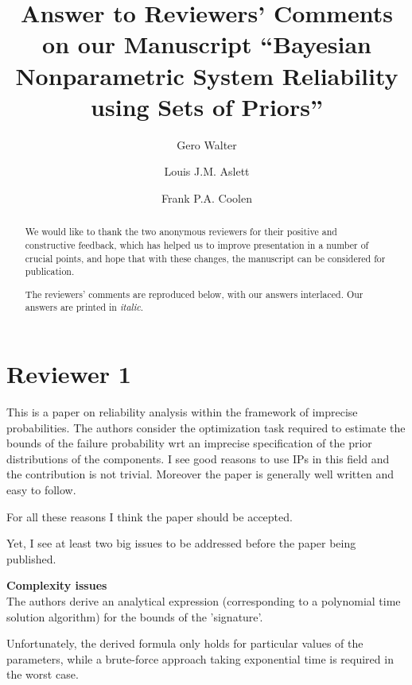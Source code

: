 \documentclass[12pt, a4paper]{elsarticle}
\begin{document}
\begin{frontmatter}
\title{Answer to Reviewers' Comments on our Manuscript ``Bayesian Nonparametric System Reliability\\ using Sets of Priors''}

\author[ein]{Gero Walter}
\author[oxf]{Louis J.M. Aslett}
\author[dur]{Frank P.A. Coolen}

\address[ein]{School of Industrial Engineering, Eindhoven University of Technology, Eindhoven, NL}
\address[oxf]{Department of Statistics, University of Oxford, Oxford, UK}
\address[dur]{Department of Mathematical Sciences, Durham University, Durham, UK}

\begin{abstract}
We would like to thank the two anonymous reviewers for their positive and constructive feedback,
which has helped us to improve presentation in a number of crucial points, and hope that with these changes,
the manuscript can be considered for publication.

The reviewers' comments are reproduced below, with our answers interlaced. Our answers are printed in \emph{italic}.
\end{abstract}
\end{frontmatter}

\section*{Reviewer 1}

This is a paper on reliability analysis within the framework of imprecise probabilities. The authors consider the optimization task required to estimate the bounds of the failure probability wrt an imprecise specification of the prior distributions of the components. I see good reasons to use IPs in this field and the contribution is not trivial. Moreover the paper is generally well written and easy to follow.

For all these reasons I think the paper should be accepted.

Yet, I see at least two big issues to be addressed before the paper being published.

\medskip
\textbf{Complexity issues}\\
The authors derive an analytical expression (corresponding to a polynomial time solution algorithm) for the bounds of the 'signature'.

Unfortunately, the derived formula only holds for particular values of the parameters, while a brute-force approach taking exponential time is required in the worst case.
\end{document}
